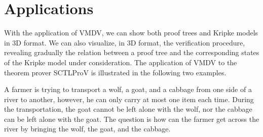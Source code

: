 \documentclass[runningheads]{llncs}
\newcommand\tool[1]{\textsf{#1}}
\newcommand\vmdv{\tool{VMDV}}
\begin{document}
 

 

\section{Applications}
With the application of \textsf{VMDV}, we can show both proof trees and Kripke models in 3D format.
We can also visualize, in 3D format, the verification procedure,
revealing gradually the relation between a proof tree and the corresponding states of the Kripke model under consideration.
The application of \vmdv{} to the theorem prover \textsf{SCTLProV} is illustrated in the following two examples.
 
\begin{example}
\label{expl:river}
A farmer is trying to transport a wolf, a goat, and a cabbage from one side of a river to another, however, he can only carry at most one item each time. During the transportation, the goat cannot be left alone with the wolf, nor the cabbage can be left alone with the goat.
The question is how can the farmer get across the river by bringing the wolf, the goat, and the cabbage.
\end{example}
 
\end{document}
